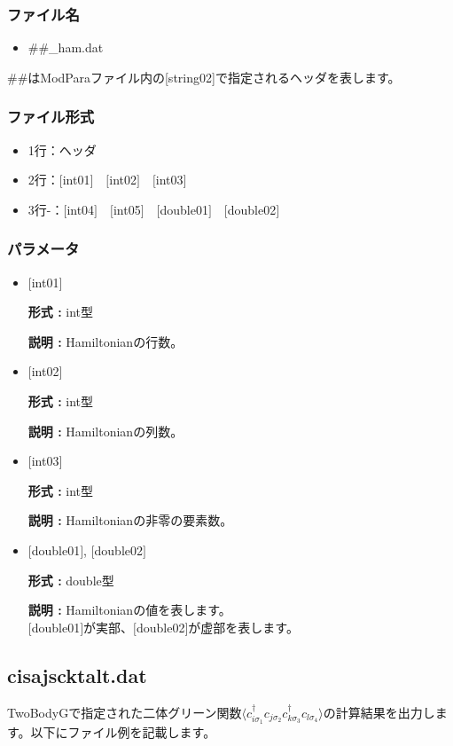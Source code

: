 \subsubsection{ファイル名}
 \begin{itemize}
 \item \#\#\_ham.dat
 \end{itemize}
 \#\#はModParaファイル内の[string02]で指定されるヘッダを表します。


\subsubsection{ファイル形式}
 \begin{itemize}
   \item  1行：ヘッダ
   \item  2行：$[$int01$]$~~$[$int02$]$~~$[$int03$]$
   \item  3行-：$[$int04$]$~~$[$int05$]$~~$[$double01$]$~~$[$double02$]$
  \end{itemize}
\subsubsection{パラメータ}
 \begin{itemize}

  \item  $[$int01$]$

 {\bf 形式 :} int型

{\bf 説明 :} Hamiltonianの行数。
 
  \item  $[$int02$]$

 {\bf 形式 :} int型 

{\bf 説明 :} Hamiltonianの列数。

  \item  $[$int03$]$

 {\bf 形式 :} int型 

{\bf 説明 :} Hamiltonianの非零の要素数。

  \item  $[$double01$]$, $[$double02$]$

 {\bf 形式 :} double型 

{\bf 説明 :} Hamiltonianの値を表します。\\
$[$double01$]$が実部、$[$double02$]$が虚部を表します。

\end{itemize}

\newpage
\subsection{cisajscktalt.dat}
\label{Subsec:cisajscktalt}
TwoBodyGで指定された二体グリーン関数$\langle c_{i\sigma_1}^{\dagger}c_{j\sigma_2}c_{k\sigma_3}^{\dagger}c_{l\sigma_4}\rangle$の計算結果を出力します。以下にファイル例を記載します。

